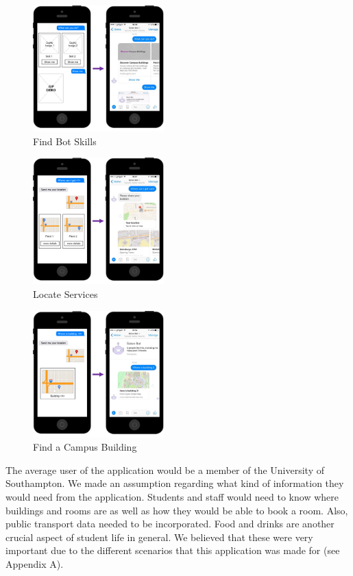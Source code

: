 \documentclass[journal, a4paper]{IEEEtran}
\begin{document}
\begin{figure}
	\centering
    \includegraphics[width=0.45\textwidth]{images/wf-skills}
    \caption{{\small Find Bot Skills}}    
    \label{fig:wf:skills}
\end{figure}
\begin{figure}
	\centering
    \includegraphics[width=0.45\textwidth]{images/wf-services}
	\caption{{\small Locate Services}}   
    \label{fig:wf:services}

\end{figure}
\begin{figure}
	\centering
    \includegraphics[width=0.45\textwidth]{images/wf-building}
	\caption{{\small Find a Campus Building}} 
	\label{fig:wf:building}
\end{figure}

The average user of the application would be a member of the University of Southampton. We made an assumption regarding what kind of information they would need from the application. Students and staff would need to know where buildings and rooms are as well as how they would be able to book a room. Also, public transport data needed to be incorporated. Food and drinks are another crucial aspect of student life in general. We believed that these were very important due to the different scenarios that this application was made for (see Appendix A).
\end{document}
